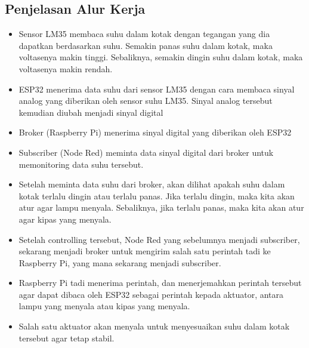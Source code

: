 \subsection{Penjelasan Alur Kerja}
    \begin{itemize}
        \item Sensor LM35 membaca suhu dalam kotak dengan tegangan yang dia dapatkan berdasarkan suhu. Semakin panas suhu dalam kotak, maka voltasenya makin tinggi. Sebaliknya, semakin dingin suhu dalam kotak, maka voltasenya makin rendah.
        \item ESP32 menerima data suhu dari sensor LM35 dengan cara membaca sinyal analog yang diberikan oleh sensor suhu LM35. Sinyal analog tersebut kemudian diubah menjadi sinyal digital
        \item Broker (Raspberry Pi) menerima sinyal digital yang diberikan oleh ESP32
        \item Subscriber (Node Red) meminta data sinyal digital dari broker untuk memonitoring data suhu tersebut. 
        \item Setelah meminta data suhu dari broker, akan dilihat apakah suhu dalam kotak terlalu dingin atau terlalu panas. Jika terlalu dingin, maka kita akan atur agar lampu menyala. Sebaliknya, jika terlalu panas, maka kita akan atur agar kipas yang menyala.
        \item Setelah controlling tersebut, Node Red yang sebelumnya menjadi subscriber, sekarang menjadi broker untuk mengirim salah satu perintah tadi ke Raspberry Pi, yang mana sekarang menjadi subscriber.
        \item Raspberry Pi tadi menerima perintah, dan menerjemahkan perintah tersebut agar dapat dibaca oleh ESP32 sebagai perintah kepada aktuator, antara lampu yang menyala atau kipas yang menyala.
        \item Salah satu aktuator akan menyala untuk menyesuaikan suhu dalam kotak tersebut agar tetap stabil.
    \end{itemize} 
    